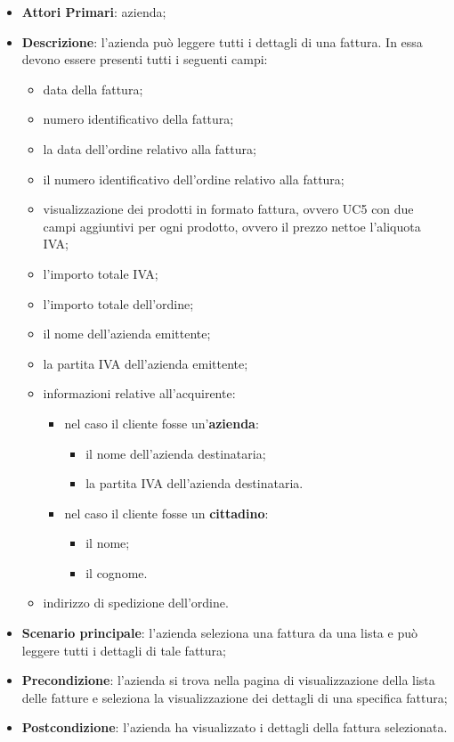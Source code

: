 \begin{itemize}
	\item \textbf{Attori Primari}: azienda;
	\item \textbf{Descrizione}: l'azienda può leggere tutti i dettagli di una fattura. In essa devono essere presenti tutti i seguenti campi:
	\begin{itemize}
		\item data della fattura;
		\item numero identificativo della fattura;
		\item la data dell'ordine relativo alla fattura;
		\item il numero identificativo dell'ordine relativo alla fattura;
		\item visualizzazione dei prodotti in formato fattura, ovvero UC5 con due campi aggiuntivi per ogni prodotto, ovvero il prezzo netto\glosp e l'aliquota IVA;
		\item l'importo totale IVA;
		\item l'importo totale dell'ordine;
		\item il nome dell'azienda emittente;
		\item la partita IVA dell'azienda emittente;
		\item informazioni relative all'acquirente:
		\begin{itemize}
			\item nel caso il cliente fosse un'\textbf{azienda}:
			\begin{itemize}
				\item il nome dell'azienda destinataria;
				\item la partita IVA dell'azienda destinataria.
			\end{itemize}
			\item nel caso il cliente fosse un \textbf{cittadino}:
			\begin{itemize}
				\item il nome;
				\item il cognome.
			\end{itemize}
		\end{itemize}
		
		\item indirizzo di spedizione dell'ordine.
	\end{itemize}
	\item \textbf{Scenario principale}: l'azienda seleziona una fattura da una lista e può leggere tutti i dettagli di tale fattura;
	\item \textbf{Precondizione}: l'azienda si trova nella pagina di visualizzazione della lista delle fatture e seleziona la visualizzazione dei dettagli di una specifica fattura;
	\item \textbf{Postcondizione}: l'azienda ha visualizzato i dettagli della fattura selezionata.
\end{itemize} 



